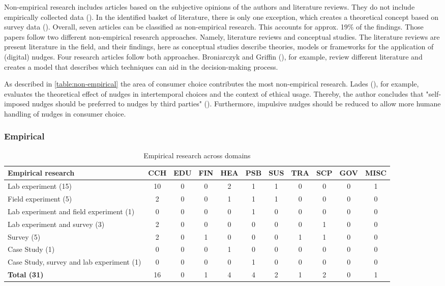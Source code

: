 Non-empirical research includes articles based on the subjective opinions of the authors and literature reviews. They do not include empirically collected data (\cite{alavi_review_1992}). In the identified basket of literature, there is only one exception,  which creates a theoretical concept based on survey data (\cite{gamliel_average_2017}). Overall, seven articles can be classified as non-empirical research. This accounts for approx. 19\% of the findings. Those papers follow two different non-empirical research approaches. Namely, literature reviews and conceptual studies. The literature reviews are present literature in the field, and their findings, here as conceptual studies describe theories, models or frameworks for the application of (digital) nudges. Four research articles follow both approaches. Broniarczyk and Griffin (\citeyear{broniarczyk_decision_2014}), for example, review different literature and creates a model that describes which techniques can aid in the decision-making process.

As described in  \ref{table:non-empirical} the area of consumer choice contributes the most non-empirical research. Lades (\citeyear{lades_impulsive_2014}), for example, evaluates the theoretical effect of nudges in intertemporal choices and the context of ethical usage. Thereby, the author concludes that "self-imposed nudges should be preferred to nudges by third parties" (\cite[p.122]{lades_impulsive_2014}). Furthermore, impulsive nudges should be reduced to allow more humane handling of nudges in consumer choice.


\subsubsection{Empirical}
\begin{table}[htbp]
\small
\centering
\begin{tabular}{p{3.6cm}|cccccccccc}
\textbf{Empirical research} & \textbf{CCH} & \textbf{EDU} & \textbf{FIN} & \textbf{HEA} & \textbf{PSB} & \textbf{SUS} & \textbf{TRA} & \textbf{SCP} & \textbf{GOV} & \textbf{MISC} \\ \hline
Lab experiment (15) & 10 & 0 & 0 & 2 & 1 & 1 & 0 & 0 & 0 & 1 \\
Field experiment (5) & 2 & 0 & 0 & 1 & 1 & 1 & 0 & 0 & 0 & 0 \\
Lab experiment and field experiment (1) & 0 & 0 & 0 & 0 & 1 & 0 & 0 & 0 & 0 & 0 \\
Lab experiment and survey (3) & 2 & 0 & 0 & 0 & 0 & 0 & 0 & 1 & 0 & 0 \\
Survey (5) & 2 & 0 & 1 & 0 & 0 & 0 & 1 & 1 & 0 & 0 \\
Case Study (1) & 0 & 0 & 0 & 1 & 0 & 0 & 0 & 0 & 0 & 0 \\
Case Study, survey and lab experiment (1) & 0 & 0 & 0 & 0 & 1 & 0 & 0 & 0 & 0 & 0 \\ \hline
\textbf{Total (31)} & 16 & 0 & 1 & 4 & 4 & 2 & 1 & 2 & 0 & 1
\end{tabular}
\caption{Empirical research across domains}
\label{table:empirical}
\end{table}


